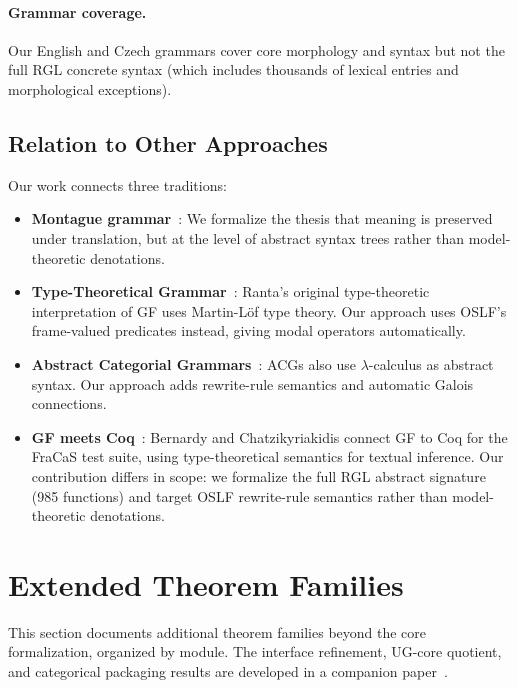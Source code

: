 \documentclass[11pt]{article}
\newcommand{\OSLF}{\textup{OSLF}}
\newcommand{\GF}{\textup{GF}}
\newcommand{\RGL}{\textup{RGL}}
\begin{document}
\paragraph{Grammar coverage.}  Our English and Czech grammars cover core
morphology and syntax but not the full \RGL{} concrete syntax (which
includes thousands of lexical entries and morphological exceptions).

\subsection{Relation to Other Approaches}

Our work connects three traditions:

\begin{itemize}
\item \textbf{Montague grammar}~\cite{Montague1973}: We formalize the
  thesis that meaning is preserved under translation, but at the level of
  abstract syntax trees rather than model-theoretic denotations.
\item \textbf{Type-Theoretical Grammar}~\cite{Ranta1994}: Ranta's original
  type-theoretic interpretation of \GF{} uses Martin-L\"{o}f type theory.
  Our approach uses \OSLF{}'s frame-valued predicates instead, giving modal
  operators automatically.
\item \textbf{Abstract Categorial Grammars}~\cite{deGroote2001}: ACGs also
  use $\lambda$-calculus as abstract syntax.  Our approach adds rewrite-rule
  semantics and automatic Galois connections.
\item \textbf{GF meets Coq}~\cite{BernardyChatzikyriakidis2017}:
  Bernardy and Chatzikyriakidis connect \GF{} to Coq for the FraCaS test
  suite, using type-theoretical semantics for textual inference.  Our
  contribution differs in scope: we formalize the full \RGL{} abstract
  signature (985 functions) and target \OSLF{} rewrite-rule semantics
  rather than model-theoretic denotations.
\end{itemize}

\section{Extended Theorem Families}
\label{sec:extensions}

This section documents additional theorem families beyond the core
formalization, organized by module.
The interface refinement, UG-core quotient, and categorical packaging results
are developed in a companion paper~\cite{UGCores2026}.
\end{document}
